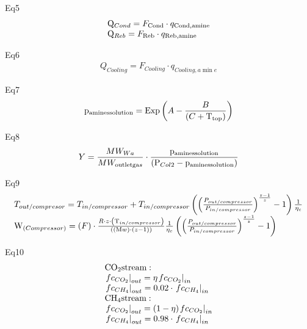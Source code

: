 \documentclass[10pt,a4paper]{article}
\begin{document}
Eq5
\begin{align}
	\begin{array}{l}{{\rm{Q}}_{Cond}} = {F_{{\rm{Cond}}}}\cdot{q_{{\rm{Cond,amine}}}}\\{{\rm{Q}}_{Reb}} = {F_{{\rm{Reb}}}}\cdot{q_{{\rm{Reb,amine}}}}\end{array}
\end{align}

Eq6
\begin{align}
	{Q_{Cooling}} = {F_{Cooling}}\cdot{q_{Cooling,a\min e}}
\end{align}

Eq7
\begin{align}
	{{\rm{p}}_{{\rm{amines solution}}}}{\rm{ }} = {\rm{Exp}}\left( {A - \frac{B}{{\left( {C + {{\rm{T}}_{{\rm{top}}}}} \right)}}} \right)
\end{align}

Eq8
\begin{align}
	Y = \frac{{M{W_{Wa}}}}{{M{W_{{\rm{outlet ga}}s}}}}\cdot\frac{{{{\rm{p}}_{{\rm{amines solution}}}}}}{{\left( {{{\rm{P}}_{Col2}} - {{\rm{p}}_{{\rm{amines solution}}}}} \right)}}
\end{align}

Eq9
\begin{align}
	\begin{array}{l}{T_{out/compresor}} = {T_{in/compressor}} + {T_{in/compressor}}\left( {{{\left( {\frac{{{P_{out/compressor}}}}{{{P_{in/compressor}}}}} \right)}^{\frac{{z - 1}}{z}}} - 1} \right)\frac{1}{{{\eta _c}}}\\{{\rm{W}}_{\left( {Compressor} \right)}} = \left( F \right)\cdot\frac{{R\cdot z\cdot\left( {{{\rm{T}}_{in/compressor}}} \right)}}{{\left( {\left( {{\rm{M}}w} \right)\cdot\left( {z - {\rm{1}}} \right)} \right)}}\frac{1}{{{\eta _c}}}\left( {{{\left( {\frac{{{P_{out/compressor}}}}{{{P_{in/compressor}}}}} \right)}^{\frac{{z - 1}}{z}}} - {\rm{1}}} \right)\end{array}
\end{align}

Eq10
\begin{align}
	\begin{array}{l}{\rm{C}}{{\rm{O}}_{\rm{2}}}{\rm{ stream:}}\\{\left. {f{c_{C{O_2}}}} \right|_{out}} = \eta {\left. {f{c_{C{O_2}}}} \right|_{in}}\\{\left. {f{c_{C{H_4}}}} \right|_{out}} = 0.02\cdot{\left. {f{c_{C{H_4}}}} \right|_{in}}\\{\rm{C}}{{\rm{H}}_{\rm{4}}}{\rm{ stream:}}\\{\left. {f{c_{C{O_2}}}} \right|_{out}} = (1 - \eta ){\left. {f{c_{C{O_2}}}} \right|_{in}}\\{\left. {f{c_{C{H_4}}}} \right|_{out}} = 0.98\cdot{\left. {f{c_{C{H_4}}}} \right|_{in}}\end{array}
\end{align}
\end{document}
